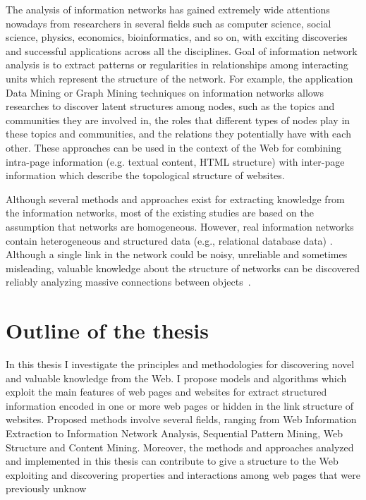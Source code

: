 The analysis of information networks %
has gained extremely wide attentions nowadays from researchers in several fields such as
computer science, social science, physics, economics, bioinformatics, and so on, with exciting discoveries and successful applications across all the disciplines. Goal of information network analysis is to extract patterns or regularities in relationships among interacting units which represent the structure of the network. 
For example, the application Data Mining or Graph Mining techniques on information networks allows researches to discover latent structures among nodes, such as the topics and communities they are involved in, the roles that different types of nodes play in these topics and communities, and the relations they potentially have with each other. These approaches can be used in the context of the Web for combining intra-page information (e.g. textual content, HTML structure) with inter-page information which describe the topological structure of websites.

Although several methods and approaches exist for extracting knowledge from the information networks, most of the existing studies are based on the assumption that  networks are homogeneous. %
However, real information networks contain heterogeneous and structured data (e.g., relational database data) \cite{Sun:2012}. Although a single link in the network could be noisy, unreliable and sometimes misleading, valuable knowledge about the structure of networks can be discovered reliably analyzing massive connections between objects~\cite{Kargupta:2008}.
\section{Outline of the thesis}

In this thesis I investigate the principles and methodologies for discovering novel and valuable knowledge from the Web.  I propose models and algorithms which exploit the main features of web pages and websites for extract structured information encoded in one or more web pages or hidden in the link structure of websites. Proposed methods involve several fields, ranging from Web Information Extraction to Information Network Analysis, Sequential Pattern Mining, Web Structure and Content Mining. Moreover, the methods and approaches analyzed and implemented in this thesis can contribute to give a structure to the Web exploiting and discovering properties and interactions among web pages that were previously unknow

